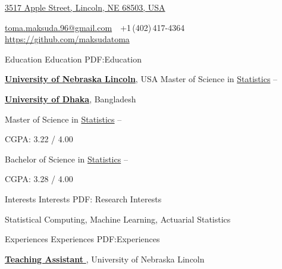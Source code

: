 \documentclass[letterpaper,MMMyyyy,nonstopmode]{simpleresumecv}
\newcommand{\CVAuthor}{Maksuda Aktar Toma}
\newcommand{\CVWebpage}{https://github.com/maksudatoma}
\begin{document}

\Title{\CVAuthor}

\begin{SubTitle}
\href{https://www.google.com/maps/place/17+Prime+Avenue,+Springfield,+Pennsylvania+10111,+USA}
{3517 Apple Street, Lincoln, NE 68503, USA}
\par
\href{mailto:johndoe@example.com}
{toma.maksuda.96@gmail.com}
\,\SubBulletSymbol\,
+1\,(402)\,417-4364
\,\SubBulletSymbol\,
\href{\CVWebpage}
{\url{\CVWebpage}}
\end{SubTitle}

\begin{Body}


\Section
{Education}
{Education}
{PDF:Education}

\Entry
\href{http://www.example.com/my-university}
{\textbf{University of Nebraska Lincoln}},
  USA
\Gap
\BulletItem
Master of Science in
\href{http://www.example.com/my-department}
{Statistics}
\hfill
{} --

\Gap
\Entry
\href{http://www.example.com/my-college}
{\textbf{University of Dhaka}},
Bangladesh         

\Gap
\BulletItem
Master of Science in
\href{http://www.example.com/my-department}
{Statistics}
\hfill
{} --

\SubBulletItem
CGPA: 3.22 / 4.00

\Gap
\BulletItem
Bachelor of Science in
\href{http://www.example.com/my-department}
{Statistics}
\hfill
{} --
\begin{Detail}
\SubBulletItem
CGPA: 3.28 / 4.00
\end{Detail}


\Section
{Interests}
{Interests}
{PDF: Research Interests}

\Entry
Statistical Computing,
Machine Learning,
Actuarial Statistics


\Section
{ Experiences}
{ Experiences}
{PDF:Experiences}

\Entry
\href{http://www.example.com/my-institute}
{\textbf{Teaching Assistant }},
University of Nebraska Lincoln


\end{Body}
\end{document}

